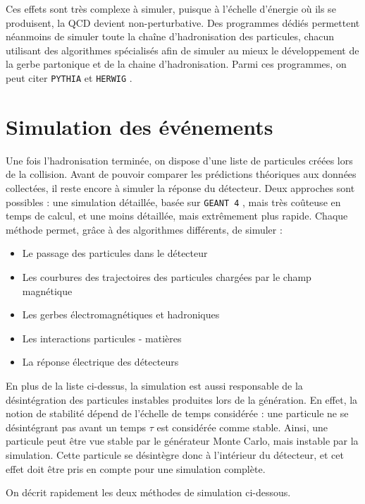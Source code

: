 Ces effets sont très complexe à simuler, puisque à l'échelle d'énergie où ils se produisent, la QCD devient non-perturbative. Des programmes dédiés permettent néanmoins de simuler toute la chaîne d'hadronisation des particules, chacun utilisant des algorithmes spécialisés afin de simuler au mieux le développement de la gerbe partonique et de la chaine d'hadronisation. Parmi ces programmes, on peut citer \texttt{PYTHIA} \citep{pythia} et \texttt{HERWIG} \citep{Corcella:2000bw}.

\section{Simulation des événements}

Une fois l'hadronisation terminée, on dispose d'une liste de particules créées lors de la collision. Avant de pouvoir comparer les prédictions théoriques aux données collectées, il reste encore à simuler la réponse du détecteur. Deux approches sont possibles : une simulation détaillée, basée sur \texttt{GEANT 4} \citep{Agostinelli2003250}, mais très coûteuse en temps de calcul, et une moins détaillée, mais extrêmement plus rapide. Chaque méthode permet, grâce à des algorithmes différents, de simuler :
\begin{itemize}
    \item Le passage des particules dans le détecteur
    \item Les courbures des trajectoires des particules chargées par le champ magnétique
    \item Les gerbes électromagnétiques et hadroniques
    \item Les interactions particules - matières
    \item La réponse électrique des détecteurs
\end{itemize}

En plus de la liste ci-dessus, la simulation est aussi responsable de la désintégration des particules instables produites lors de la génération. En effet, la notion de stabilité dépend de l'échelle de temps considérée : une particule ne se désintégrant pas avant un temps $\tau$ est considérée comme stable. Ainsi, une particule peut être vue stable par le générateur Monte Carlo, mais instable par la simulation. Cette particule se désintègre donc à l'intérieur du détecteur, et cet effet doit être pris en compte pour une simulation complète.

\medskip

On décrit rapidement les deux méthodes de simulation ci-dessous.

